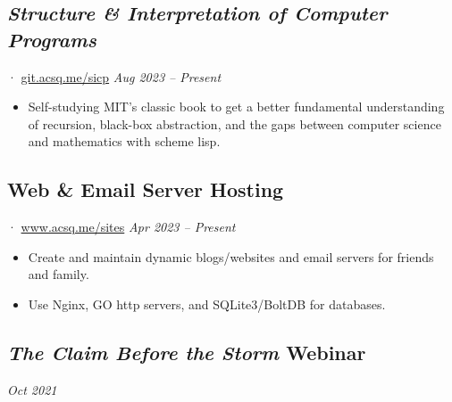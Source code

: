 \documentclass[12pt]{article}
\newcommand{\itemspace}{\vspace{0.1870em}}
\renewcommand{\textsc}[1]{\uppercase{\footnotesize#1}\normalsize}
\begin{document}
\subsection{\textit{Structure \& Interpretation of Computer Programs}} ·
\href{https://git.acsq.me/sicp/about/}{git.acsq.me/sicp}
\hfill \textit{Aug 2023 -- Present}

\begin{itemize}[noitemsep,nolistsep]
  \item Self-studying MIT's classic book to get a better fundamental
    understanding of recursion, black-box abstraction, and the gaps between computer
    science and mathematics with scheme lisp.
\end{itemize}

\itemspace

\subsection{Web \& Email Server Hosting} ·
\href{https://www.acsq.me/sites}{www.acsq.me/sites}
\hfill \textit{Apr 2023 -- Present}

\begin{itemize}[noitemsep,nolistsep]
  \item Create and maintain dynamic blogs/websites and email servers for
    friends and family.

  \item Use Nginx, \textsc{go} http servers, and SQLite3/BoltDB for databases.
\end{itemize}

\itemspace


\subsection{\textit{The Claim Before the Storm} Webinar} \hfill \textit{Oct 2021}
\end{document}
